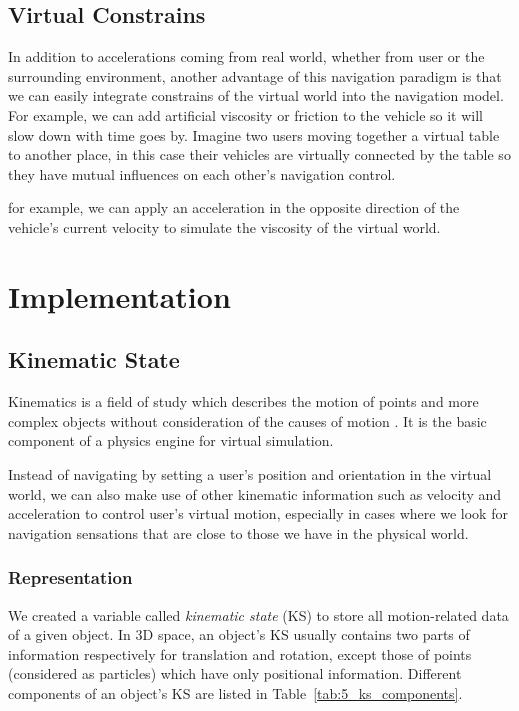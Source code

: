 \subsection{Virtual Constrains}
In addition to accelerations coming from real world, whether from user or the surrounding environment, another advantage of this navigation paradigm is that we can easily integrate constrains of the virtual world into the navigation model. For example, we can add artificial viscosity or friction to the vehicle so it will slow down with time goes by. Imagine two users moving together a virtual table to another place, in this case their vehicles are virtually connected by the table so they have mutual influences on each other's navigation control.

for example, we can apply an acceleration in the opposite direction of the vehicle's current velocity to simulate the viscosity of the virtual world. 




\section{Implementation}
\subsection{Kinematic State}
Kinematics is a field of study which describes the motion of points and more complex objects without consideration of the causes of motion \citep{Beggs1983Kinematics}. It is the basic component of a physics engine for virtual simulation.

Instead of navigating by setting a user's position and orientation in the virtual world, we can also make use of other kinematic information such as velocity and acceleration to control user's virtual motion, especially in cases where we look for navigation sensations that are close to those we have in the physical world. 

\subsubsection{Representation}
We created a variable called \textit{kinematic state} (KS) to store all motion-related data of a given object. In 3D space, an object's KS usually contains two parts of information respectively for translation and rotation, except those of points (considered as particles) which have only positional information. Different components of an object's KS are listed in Table~\ref{tab:5_ks_components}.

